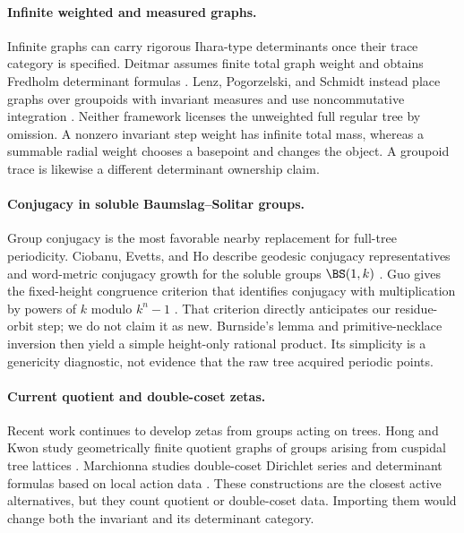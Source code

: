 \paragraph{Infinite weighted and measured graphs.}
Infinite graphs can carry rigorous Ihara-type determinants once their trace
category is specified.  Deitmar assumes finite total graph weight and obtains
Fredholm determinant formulas \citep{deitmar2015ihara}.  Lenz, Pogorzelski,
and Schmidt instead place graphs over groupoids with invariant measures and
use noncommutative integration \citep{lenz2019ihara}.  Neither framework
licenses the unweighted full regular tree by omission.  A nonzero invariant
step weight has infinite total mass, whereas a summable radial weight chooses
a basepoint and changes the object.  A groupoid trace is likewise a different
determinant ownership claim.

\paragraph{Conjugacy in soluble Baumslag--Solitar groups.}
Group conjugacy is the most favorable nearby replacement for full-tree
periodicity.  Ciobanu, Evetts, and Ho describe geodesic conjugacy
representatives and word-metric conjugacy growth for the soluble groups
$\BS(1,k)$ \citep{ciobanu2020conjugacy}.  Guo gives the fixed-height
congruence criterion that identifies conjugacy with multiplication by powers
of $k$ modulo $k^n-1$ \citep{guo2026conjugacy}.  That criterion directly
anticipates our residue-orbit step; we do not claim it as new.  Burnside's
lemma and primitive-necklace inversion then yield a simple height-only
rational product.  Its simplicity is a genericity diagnostic, not evidence
that the raw tree acquired periodic points.

\paragraph{Current quotient and double-coset zetas.}
Recent work continues to develop zetas from groups acting on trees.  Hong and
Kwon study geometrically finite quotient graphs of groups arising from
cuspidal tree lattices \citep{hong2023zeta}.  Marchionna studies double-coset
Dirichlet series and determinant formulas based on local action data
\citep{marchionna2026double}.  These constructions are the closest active
alternatives, but they count quotient or double-coset data.  Importing them
would change both the invariant and its determinant category.

